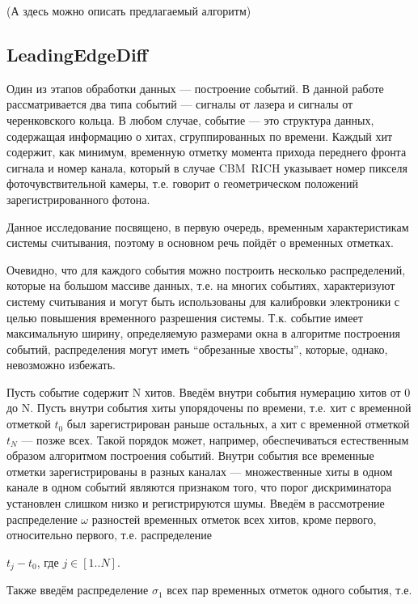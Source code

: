 (А здесь можно описать предлагаемый алгоритм)

\subsection{LeadingEdgeDiff}\label{sec:secLeadingEdgeDiff}

Один из этапов обработки данных --- построение событий. В данной работе рассматривается два типа событий --- сигналы от лазера и сигналы от черенковского кольца. В любом случае, событие --- это структура данных, содержащая информацию о хитах, сгруппированных по времени. Каждый хит содержит, как минимум, временную отметку момента прихода переднего фронта сигнала и номер канала, который в случае CBM~RICH указывает номер пикселя фоточувствительной камеры, т.е. говорит о геометрическом положений зарегистрированного фотона.

Данное исследование посвящено, в первую очередь, временным характеристикам системы считывания, поэтому в основном речь пойдёт о временных отметках.

Очевидно, что для каждого события можно построить несколько распределений, которые на большом массиве данных, т.е. на многих событиях, характеризуют систему считывания и могут быть использованы для калибровки электроники с целью повышения временного разрешения системы. Т.к. событие имеет максимальную ширину, определяемую размерами окна в алгоритме построения событий, распределения могут иметь ``обрезанные хвосты'', которые, однако, невозможно избежать.

Пусть событие содержит N хитов. Введём внутри события нумерацию хитов от 0 до N. Пусть внутри события хиты упорядочены по времени, т.е. хит с временной отметкой $ t_{0} $ был зарегистрирован раньше остальных, а хит с временной отметкой $ t_{N} $ --- позже всех. Такой порядок может, например, обеспечиваться естественным образом алгоритмом построения событий. Внутри события все временные отметки зарегистрированы в разных каналах --- множественные хиты в одном канале в одном событий являются признаком того, что порог дискриминатора установлен слишком низко и регистрируются шумы. Введём в рассмотрение распределение $ \omega $ разностей временных отметок всех хитов, кроме первого, относительно первого, т.е. распределение

{\centering
$ t_{j} - t_{0} $, где  $ j \in [1..N] $.\\
}

Также введём распределение $ \sigma_{1} $ всех пар временных отметок одного события, т.е.

